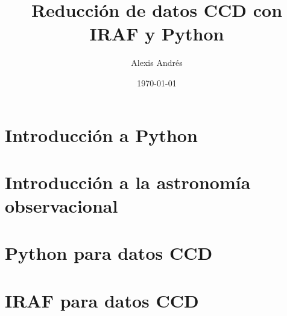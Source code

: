 \documentclass[11pt, letterpaper]{report}
\title{\bf\Huge Reducción de datos CCD con IRAF y Python}
\author{Alexis Andrés}
\date{\today}
\begin{document}
\renewcommand*\thepart{\arabic{part}}
\renewcommand{\partname}{Unidad}
\renewcommand{\chaptername}{Clase}
\renewcommand{\tablename}{Tabla}

\maketitle

\tableofcontents

\part{Introducción a Python}





\part{Introducción a la astronomía observacional}





\part{Python para datos CCD}





\part{IRAF para datos CCD}




\end{document}
